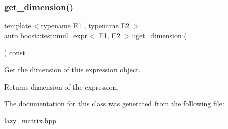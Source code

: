 \subsubsection{\texorpdfstring{get\_dimension()}{get\_dimension()}}
{\footnotesize\ttfamily template$<$typename E1 , typename E2 $>$ \\
auto \mbox{\hyperlink{classboost_1_1test_1_1mul__expr}{boost\+::test\+::mul\+\_\+expr}}$<$ E1, E2 $>$\+::get\+\_\+dimension (\begin{DoxyParamCaption}{ }\end{DoxyParamCaption}) const\hspace{0.3cm}{\ttfamily [inline]}}



Get the dimension of this expression object. 

\begin{DoxyReturn}{Returns}
dimension of the expression. 
\end{DoxyReturn}


The documentation for this class was generated from the following file\+:\begin{DoxyCompactItemize}
\item 
lazy\+\_\+matrix.\+hpp\end{DoxyCompactItemize}

